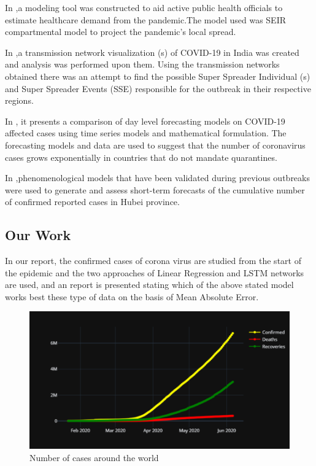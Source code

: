 
In \cite{rainisch2020dynamic},a modeling tool was constructed to aid active public health officials to estimate
healthcare demand from the pandemic.The model used was SEIR compartmental model
to project the pandemic’s local spread.

In \cite{singh2020connecting},a transmission network visualization (s) of COVID-19 in India was created and
analysis was performed upon them. Using the transmission networks obtained there was
an attempt to find the possible Super Spreader Individual (s) and Super Spreader Events
(SSE) responsible for the outbreak in their respective regions.

In \cite{elmousalami2020day}, it presents a comparison of day level forecasting models on COVID-19 affected
cases using time series models and mathematical formulation. The forecasting models
and data are used to suggest that the number of coronavirus cases grows exponentially
in countries that do not mandate quarantines.

In \cite{roosa2020real},phenomenological models that have been validated during previous outbreaks
were used to generate and assess short-term forecasts of the cumulative number of
confirmed reported cases in Hubei province.

\subsection{Our Work}

In our report, the confirmed cases of corona virus are studied from the start
of the epidemic and the two approaches of Linear Regression and LSTM networks
are used, and an report is presented stating which of the above stated model
works best these type of data on the basis of Mean Absolute Error.

\begin{figure}[h!]
	\centering
	\includegraphics[scale=0.4]{images/world_wide.png}
	\caption{Number of cases around the world}
	\label{fig:world}
\end{figure}

